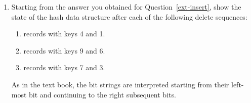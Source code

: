 \documentclass{article}
\begin{document}
\begin{enumerate}[resume]
\begin{enumerate}
\item \label{ext-two} Starting from the answer you obtained for
  Question~\ref{ext-insert}, show the state of the hash data structure
  after each of the following delete sequences:

\begin{enumerate}

\item records with keys 4 and 1.
\item records with keys 9 and 6.
\item records with keys 7 and 3.
\end{enumerate}

As in the text book, the bit strings are interpreted starting from their left-most bit and continuing to the right subsequent bits. 

\end{enumerate}
\end{enumerate}
\end{document}
